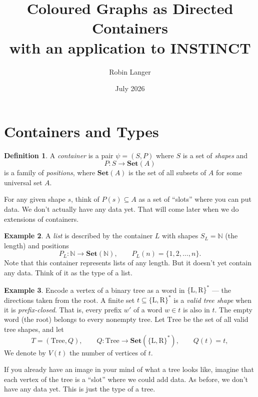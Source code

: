 \documentclass[11pt, a4paper]{article}
\title{Coloured Graphs as Directed Containers\\[0.4em]
\large with an application to INSTINCT}
\author{Robin Langer}
\date{July 2026}
\theoremstyle{definition}
\newtheorem{definition}{Definition}[section]
\newtheorem{example}[definition]{Example}
\theoremstyle{plain}
\begin{document}
\maketitle

\section{Containers and Types}

\noindent\colorbox{gray!15}{\parbox{\dimexpr\linewidth-2\fboxsep}{%
\begin{definition}
A \emph{container} is a pair $\psi = (S, P)$ where $S$ is a set of \emph{shapes} and
\[
  P : S \to \mathbf{Set}(A)
\]
is a family of \emph{positions}, where $\mathbf{Set}(A)$ is the set of all
subsets of $A$ for some universal set $A$.

For any given shape $s$, think of $P(s) \subseteq A$ as a set of
``slots'' where you can put data.  We don't actually have any data
yet.  That will come later when we do extensions of containers.
\end{definition}%
}}

\begin{example}\label{ex:list}
A \emph{list} is described by
the container $L$ with shapes $S_L = \mathbb{N}$ (the length) and positions
\[
  P_L : \mathbb{N} \to \mathbf{Set}(\mathbb{N}), \qquad
  P_L(n) = \{1, 2, \ldots, n\}.
\]
Note that this container represents lists of
any length.  But it doesn't yet contain any data.  Think of it as
the type of a list.
\end{example}

\begin{example}\label{ex:tree}
Encode a vertex of a binary tree as a word in
$\{\mathrm{L}, \mathrm{R}\}^*$ --- the directions taken from the
root.  A finite set $t \subseteq \{\mathrm{L}, \mathrm{R}\}^*$ is a
\emph{valid tree shape} when it is
\emph{prefix-closed}.  That is, every prefix $w'$ of a word
$w \in t$ is also in $t$.  The empty word (the root) belongs to every nonempty
tree.  Let $\mathrm{Tree}$ be the set of all valid tree shapes, and let
\[
  T = (\mathrm{Tree}, Q), \qquad
  Q : \mathrm{Tree} \to \mathbf{Set}(\{\mathrm{L},\mathrm{R}\}^*),
  \qquad Q(t) = t,
\]
We denote by $V(t)$ the number of vertices of $t$.

If you already have an image in your mind of what a tree looks
like, imagine that each vertex of the tree is a ``slot'' where we
could add data.  As before, we don't have any data yet.  This is
just the type of a tree.
\end{example}
\end{document}
